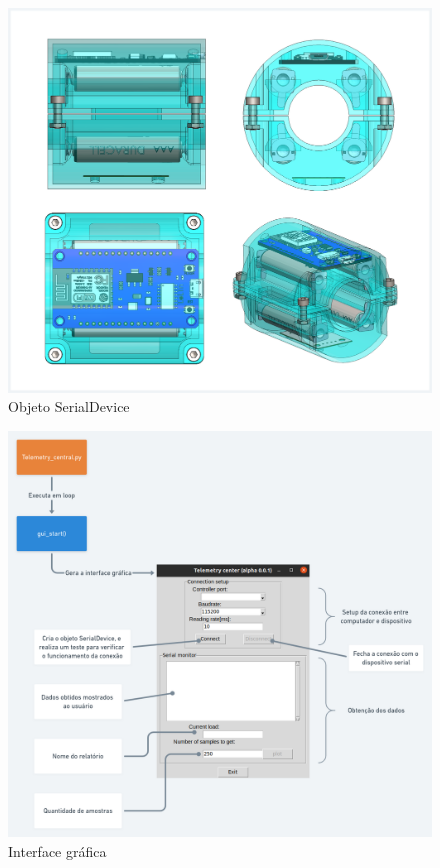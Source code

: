 \begin{figure}[htb]
	\caption{\label{fig:2040} Objeto SerialDevice}
	\begin{center}
		\includegraphics[width=\textwidth]{pictures/2040.png}
	\end{center}
\end{figure}


\begin{figure}[htb]
	\caption{\label{fig:2041} Interface gráfica}
	\begin{center}
		\includegraphics[width=\textwidth]{pictures/2041.png}
	\end{center}
\end{figure}

